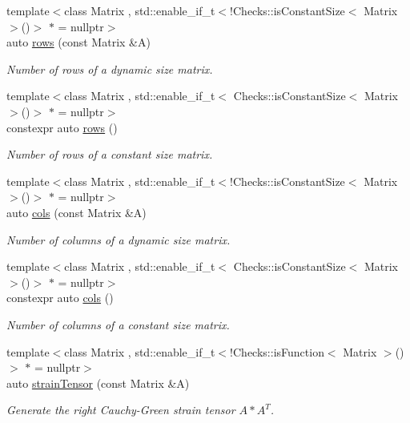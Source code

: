 \begin{DoxyCompactItemize}
{\footnotesize template$<$class Matrix , std\-::enable\-\_\-if\-\_\-t$<$!\-Checks\-::is\-Constant\-Size$<$ Matrix $>$()$>$ $\ast$  = nullptr$>$ }\\auto \hyperlink{namespacefuncy_1_1LinearAlgebra_aea4d8c30f47543a340dd7d1efda08b6d}{rows} (const Matrix \&A)
\begin{DoxyCompactList}\small\item\em Number of rows of a dynamic size matrix. \end{DoxyCompactList}\item 
{\footnotesize template$<$class Matrix , std\-::enable\-\_\-if\-\_\-t$<$ Checks\-::is\-Constant\-Size$<$ Matrix $>$()$>$ $\ast$  = nullptr$>$ }\\constexpr auto \hyperlink{namespacefuncy_1_1LinearAlgebra_a565c19fd47b92c507d1497b77d188984}{rows} ()
\begin{DoxyCompactList}\small\item\em Number of rows of a constant size matrix. \end{DoxyCompactList}\item 
{\footnotesize template$<$class Matrix , std\-::enable\-\_\-if\-\_\-t$<$!\-Checks\-::is\-Constant\-Size$<$ Matrix $>$()$>$ $\ast$  = nullptr$>$ }\\auto \hyperlink{namespacefuncy_1_1LinearAlgebra_adee762dc2457194e15c0a5e678babcb2}{cols} (const Matrix \&A)
\begin{DoxyCompactList}\small\item\em Number of columns of a dynamic size matrix. \end{DoxyCompactList}\item 
{\footnotesize template$<$class Matrix , std\-::enable\-\_\-if\-\_\-t$<$ Checks\-::is\-Constant\-Size$<$ Matrix $>$()$>$ $\ast$  = nullptr$>$ }\\constexpr auto \hyperlink{namespacefuncy_1_1LinearAlgebra_ad7f8b93aee421acae43b75a8907fb3ef}{cols} ()
\begin{DoxyCompactList}\small\item\em Number of columns of a constant size matrix. \end{DoxyCompactList}\item 
{\footnotesize template$<$class Matrix , std\-::enable\-\_\-if\-\_\-t$<$!\-Checks\-::is\-Function$<$ Matrix $>$()$>$ $\ast$  = nullptr$>$ }\\auto \hyperlink{namespacefuncy_1_1LinearAlgebra_a4d464ae754aaf51a2be4e59ae32ef1c4}{strain\-Tensor} (const Matrix \&A)
\begin{DoxyCompactList}\small\item\em Generate the right Cauchy-\/\-Green strain tensor $A*A^T$. \end{DoxyCompactList}\item 

\end{DoxyCompactItemize}
